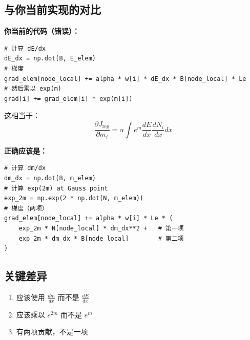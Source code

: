 \documentclass{article}
\begin{document}
\subsection*{与你当前实现的对比}

\textbf{你当前的代码（错误）：}
\begin{verbatim}
# 计算 dE/dx
dE_dx = np.dot(B, E_elem)
# 梯度
grad_elem[node_local] += alpha * w[i] * dE_dx * B[node_local] * Le
# 然后乘以 exp(m)
grad[i] += grad_elem[i] * exp(m[i])
\end{verbatim}

这相当于：
\begin{equation}
\frac{\partial J_{\text{reg}}}{\partial m_i} = \alpha \int e^{m} \frac{dE}{dx} \frac{dN_i}{dx} dx
\end{equation}

\textbf{正确应该是：}
\begin{verbatim}
# 计算 dm/dx
dm_dx = np.dot(B, m_elem)
# 计算 exp(2m) at Gauss point
exp_2m = np.exp(2 * np.dot(N, m_elem))
# 梯度（两项）
grad_elem[node_local] += alpha * w[i] * Le * (
    exp_2m * N[node_local] * dm_dx**2 +   # 第一项
    exp_2m * dm_dx * B[node_local]        # 第二项
)
\end{verbatim}

\subsection*{关键差异}

\begin{enumerate}
\item 应该使用 $\frac{dm}{dx}$ 而不是 $\frac{dE}{dx}$
\item 应该乘以 $e^{2m}$ 而不是 $e^{m}$
\item 有两项贡献，不是一项
\end{enumerate}
\end{document}
